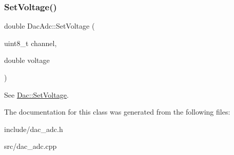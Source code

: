 \subsubsection{\texorpdfstring{Set\+Voltage()}{SetVoltage()}}
{\footnotesize\ttfamily double Dac\+Adc\+::\+Set\+Voltage (\begin{DoxyParamCaption}\item[{uint8\+\_\+t}]{channel,  }\item[{double}]{voltage }\end{DoxyParamCaption})}

See \mbox{\hyperlink{classDac_ab2f0e36184b9b529de04136c36a3a51b}{Dac\+::\+Set\+Voltage}}. 

The documentation for this class was generated from the following files\+:\begin{DoxyCompactItemize}
\item 
include/dac\+\_\+adc.\+h\item 
src/dac\+\_\+adc.\+cpp\end{DoxyCompactItemize}
